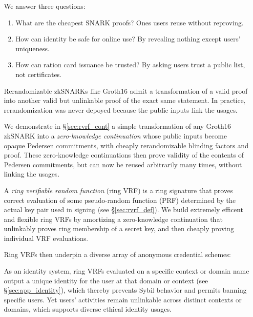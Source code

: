 
We answer three questions:
\begin{enumerate}
\item
What are the cheapest SNARK proofs?  \quad
Ones users reuse without reproving.
\item
How can identity be safe for online use?  \quad
By revealing nothing except users' uniqueness.
\item
How can ration card issuance be trusted?  \quad
By asking users trust a public list, not certificates.
\end{enumerate}

Rerandomizable zkSNARKs like Groth16 \cite{Groth16} admit a
transformation of a valid proof into another valid but unlinkable
proof of the exact same statement.  In practice, rerandomization
was never depoyed because the public inputs link the usages.

We demonstrate in \S\ref{sec:rvrf_cont} a simple transformation of
any Groth16 zkSNARK into a {\it zero-knowledge continuation} whose
public inputs become opaque Pedersen commitments, with cheaply
rerandomizable blinding factors and proof.
These zero-knowledge continuations then prove validity of the contents
of Pedersen commitments, but can now be reused arbitrarily many times,
without linking the usages. 

A {\it ring verifiable random function} (ring VRF) is a ring signature
that proves correct evaluation of some pseudo-random function (PRF)
determined by the actual key pair used in signing (see \S\ref{sec:rvrf_def}).
We build extremely efficent and flexible ring VRFs by amortizing a
zero-knowledge continuation that unlinkably proves ring membership
of a secret key, and then cheaply proving individual VRF evaluations.

Ring VRFs then underpin a diverse array of anonymous credential schemes:

\smallskip

As an identity system, ring VRFs evaluated on a specific context or
domain name output a unique identity for the user at that domain or
context (see \S\ref{sec:app_identity}), which thereby prevents
Sybil behavior and permits banning specific users.
Yet users' activities remain unlinkable across distinct contexts or
domains, which supports diverse ethical identity usages.

